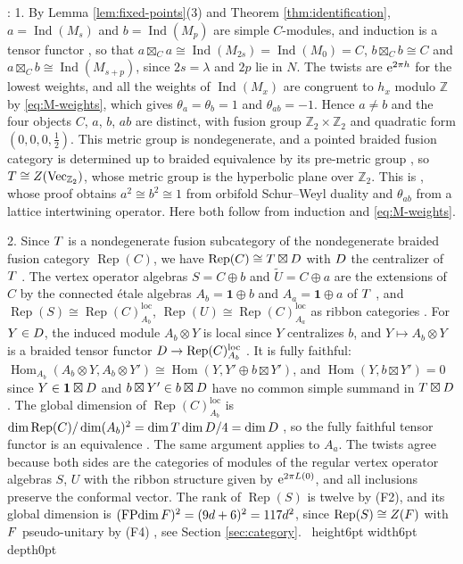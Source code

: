 \documentclass[leqno]{article}
\let\cal\relax
\newcommand{\cal}{\mathcal}
\newcommand{\Z}{\ensuremath{\mathbb{Z}}}
\newcommand{\qed}{\hfill \vrule height6pt  width6pt depth0pt}
\newcommand{\ot}{\otimes}
\let\i\relax
\newcommand{\i}{\mathrm{i}}
\newcommand{\loc}{\mathrm{loc}}
\newcommand{\e}{\mathrm{e}}
\DeclareMathOperator{\Rep}{Rep}
\DeclareMathOperator{\Ind}{Ind}
\newenvironment{proof}[1][]{\noindent {\it Proof #1} : }{\hbox{~}\qed
\smallskip
}
\numberwithin{equation}{section}
\begin{document}
\begin{proof}
1. By Lemma \ref{lem:fixed-points}(3) and Theorem \ref{thm:identification}, $a = \Ind(M_s)$ and $b = \Ind(M_p)$ are simple $C$-modules, and induction is a tensor functor \cite[Theorem 1.6 p.~7]{KiO02}, so that $a \boxtimes_C a \cong \Ind(M_{2s}) = \Ind(M_0) = C$, $b \boxtimes_C b \cong C$ and $a \boxtimes_C b \cong \Ind(M_{s+p})$, since $2s = \lambda$ and $2p$ lie in $N$. The twists are $\e^{2\pi\i h}$ for the lowest weights, and all the weights of $\Ind(M_x)$ are congruent to $h_x$ modulo $\Z$ by \eqref{eq:M-weights}, which gives $\theta_a = \theta_b = 1$ and $\theta_{ab} = -1$. Hence $a \neq b$ and the four objects $C$, $a$, $b$, $ab$ are distinct, with fusion group $\Z_2 \times \Z_2$ and quadratic form $(0,0,0,\frac12)$. This metric group is nondegenerate, and a pointed braided fusion category is determined up to braided equivalence by its pre-metric group \cite[Theorem 8.4.12 p.~206]{EGNO15}, so $\cal T \cong Z(\mathrm{Vec}_{\Z_2})$, whose metric group is the hyperbolic plane over $\Z_2$. This is \cite[Lemma 9.1]{DJX26}, whose proof obtains $a^2 \cong b^2 \cong 1$ from orbifold Schur--Weyl duality and $\theta_{ab}$ from a lattice intertwining operator. Here both follow from induction and \eqref{eq:M-weights}.

2. Since $\cal T$ is a nondegenerate fusion subcategory of the nondegenerate braided fusion category $\Rep(C)$, we have $\Rep(C) \cong \cal T \boxtimes \cal D$ with $\cal D$ the centralizer of $\cal T$ \cite[Theorem 8.21.4 p.~245]{EGNO15}. The vertex operator algebras $S = C \oplus b$ and $\tilde U = C \oplus a$ are the extensions of $C$ by the connected étale algebras $A_b = \mathbf 1 \oplus b$ and $A_a = \mathbf 1 \oplus a$ of $\cal T$ \cite[Theorem 3.2]{HKL15}, and $\Rep(S) \cong \Rep(C)^{\loc}_{A_b}$, $\Rep(U) \cong \Rep(C)^{\loc}_{A_a}$ as ribbon categories \cite[Theorem 3.4]{HKL15} \cite[Theorem 3.65]{CKM22}. For $Y \in \cal D$, the induced module $A_b \ot Y$ is local since $Y$ centralizes $b$, and $Y \mapsto A_b \ot Y$ is a braided tensor functor $\cal D \to \Rep(C)^{\loc}_{A_b}$ \cite[Theorem 1.6 p.~7]{KiO02}. It is fully faithful: $\operatorname{Hom}_{A_b}(A_b \ot Y, A_b \ot Y') \cong \operatorname{Hom}(Y, Y' \oplus b \boxtimes Y')$, and $\operatorname{Hom}(Y, b \boxtimes Y') = 0$ since $Y \in \mathbf 1 \boxtimes \cal D$ and $b \boxtimes Y' \in b \boxtimes \cal D$ have no common simple summand in $\cal T \boxtimes \cal D$. The global dimension of $\Rep(C)^{\loc}_{A_b}$ is $\dim\Rep(C)/\dim(A_b)^2 = \dim\cal T\dim\cal D/4 = \dim\cal D$ \cite[Corollary 3.32]{DMNO13}, so the fully faithful tensor functor is an equivalence \cite[Proposition 6.3.3 p.~125]{EGNO15}. The same argument applies to $A_a$. The twists agree because both sides are the categories of modules of the regular vertex operator algebras $S$, $U$ with the ribbon structure given by $\e^{2\pi\i L(0)}$, and all inclusions preserve the conformal vector. The rank of $\Rep(S)$ is twelve by (F2), and its global dimension is $(\operatorname{FPdim}\cal F)^2 = (9d+6)^2 = 117d^2$, since $\Rep(S) \cong Z(\cal F)$ with $\cal F$ pseudo-unitary by (F4) \cite[Theorem 2.15]{ENO05}, see Section \ref{sec:category}.
\end{proof}
\end{document}
